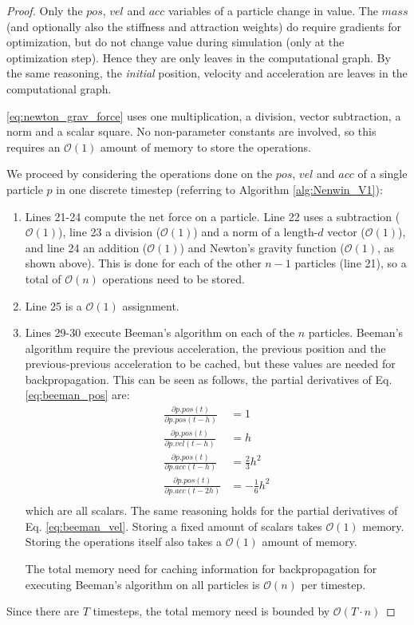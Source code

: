 \begin{proof}
Only the $pos$, $vel$ and $acc$ variables of a particle change in value. The $mass$ (and optionally also the stiffness and attraction weights) do require gradients for optimization, but do not change value during simulation (only at the optimization step). Hence they are only leaves in the computational graph. By the same reasoning, the \textit{initial} position, velocity and acceleration are leaves in the computational graph.

\eqref{eq:newton_grav_force} uses one multiplication, a division, vector subtraction, a norm and a scalar square. No non-parameter constants are involved, so this requires an $\mathcal{O}(1)$ amount of memory to store the operations.

We proceed by considering the operations done on the $pos$, $vel$ and $acc$ of a single particle $p$ in one discrete timestep (referring to Algorithm \ref{alg:Nenwin_V1}):
\begin{enumerate}
    \item Lines 21-24 compute the net force on a particle. Line 22 uses a subtraction ($\mathcal{O}(1)$), line 23 a division ($\mathcal{O}(1)$) and a norm of a length-$d$ vector ($\mathcal{O}(1)$), and line 24 an addition ($\mathcal{O}(1)$) and Newton's gravity function ($\mathcal{O}(1)$, as shown above). This is done for each of the other $n-1$ particles (line 21), so a total of $\mathcal{O}(n)$ operations need to be stored.
    \item Line 25 is a $\mathcal{O}(1)$ assignment.
    \item Lines 29-30 execute Beeman's algorithm on each of the $n$ particles. Beeman's algorithm require the previous acceleration, the previous position and the previous-previous acceleration to be cached, but these values are needed for backpropagation. This can be seen as follows, the partial derivatives of Eq. \eqref{eq:beeman_pos} are:
    \begin{align}
        \frac{\partial p.pos(t)}{\partial p.pos(t-h)} & = 1 \\
        \frac{\partial p.pos(t)}{\partial p.vel(t-h)} & = h \\
        \frac{\partial p.pos(t)}{\partial p.acc(t-h)} & = \frac{2}{3}h^2 \\
        \frac{\partial p.pos(t)}{\partial p.acc(t-2h)} & = -\frac{1}{6}h^2 \\
    \end{align}
    which are all scalars. The same reasoning holds for the partial derivatives of Eq. \eqref{eq:beeman_vel}. Storing a fixed amount of scalars takes $\mathcal{O}(1)$ memory. Storing the operations itself also takes a $\mathcal{O}(1)$ amount of memory.
    
    The total memory need for caching information for backpropagation for executing Beeman's algorithm on all particles is $\mathcal{O}(n)$ per timestep. 
\end{enumerate}
Since there are $T$ timesteps, the total memory need is bounded by $\mathcal{O}(T \cdot n)$
\end{proof}

